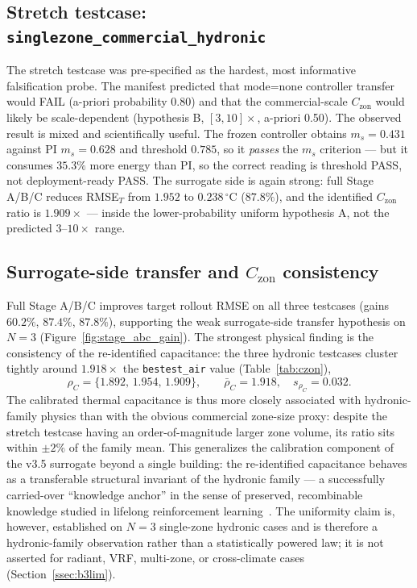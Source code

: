 \documentclass[11pt,a4paper]{article}
\begin{document}
\subsection{Stretch testcase: \texttt{singlezone\_commercial\_hydronic}}

The stretch testcase was pre-specified as the hardest, most informative falsification probe. The manifest predicted that mode=none controller transfer would FAIL (a-priori probability 0.80) and that the commercial-scale $C_{\mathrm{zon}}$ would likely be scale-dependent (hypothesis B, $[3,10]\times$, a-priori 0.50). The observed result is mixed and scientifically useful. The frozen controller obtains $m_s=0.431$ against PI $m_s=0.628$ and threshold $0.785$, so it \emph{passes} the $m_s$ criterion --- but it consumes $35.3\%$ more energy than PI, so the correct reading is threshold PASS, not deployment-ready PASS. The surrogate side is again strong: full Stage A/B/C reduces RMSE$_T$ from $1.952$ to $0.238\,^\circ$C ($87.8\%$), and the identified $C_{\mathrm{zon}}$ ratio is $1.909\times$ --- inside the lower-probability uniform hypothesis A, not the predicted $3$--$10\times$ range.

\subsection{Surrogate-side transfer and $C_{\mathrm{zon}}$ consistency}
\label{ssec:czon}

Full Stage A/B/C improves target rollout RMSE on all three testcases (gains $60.2\%$, $87.4\%$, $87.8\%$), supporting the weak surrogate-side transfer hypothesis on $N=3$ (Figure~\ref{fig:stage_abc_gain}). The strongest physical finding is the consistency of the re-identified capacitance: the three hydronic testcases cluster tightly around $1.918\times$ the \texttt{bestest\_air} value (Table~\ref{tab:czon}),
\begin{equation}
  \rho_C = \{1.892,\,1.954,\,1.909\},
  \qquad
  \bar\rho_C = 1.918,\quad s_{\rho_C} = 0.032.
  \label{eq:czon_stats}
\end{equation}
The calibrated thermal capacitance is thus more closely associated with hydronic-family physics than with the obvious commercial zone-size proxy: despite the stretch testcase having an order-of-magnitude larger zone volume, its ratio sits within $\pm2\%$ of the family mean. This generalizes the calibration component of the v3.5 surrogate beyond a single building: the re-identified capacitance behaves as a transferable structural invariant of the hydronic family --- a successfully carried-over ``knowledge anchor'' in the sense of preserved, recombinable knowledge studied in lifelong reinforcement learning~\citep{Meng2025Lifelong}. The uniformity claim is, however, established on $N=3$ single-zone hydronic cases and is therefore a hydronic-family observation rather than a statistically powered law; it is not asserted for radiant, VRF, multi-zone, or cross-climate cases (Section~\ref{ssec:b3lim}).
\end{document}
